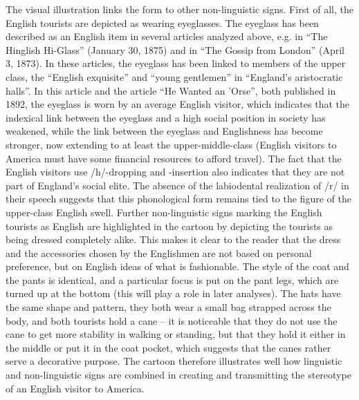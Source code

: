 The visual illustration links the form to other non-linguistic signs. First of all, the English tourists are depicted as wearing eyeglasses. The eyeglass has been described as an English item in several articles analyzed above, e.g. in “The Hinglish Hi-Glass” (January 30, 1875) and in “The Gossip from London” (April 3, 1873). In these articles, the eyeglass has been linked to members of the upper class, the “English exquisite” and “young gentlemen” in “England’s aristocratic halls”. In this article and the article “He Wanted an ’Orse”, both published in 1892, the eyeglass is worn by an average English visitor, which indicates that the indexical link between the eyeglass and a high social position in society has weakened, while the link between the eyeglass and Englishness has become stronger, now extending to at least the upper-middle-class (English visitors to America must have some financial resources to afford travel). The fact that the English visitors use /h/-dropping and -insertion also indicates that they are not part of England’s social elite. The absence of the labiodental realization of /r/ in their speech suggests that this phonological form remains tied to the figure of the upper-class English swell. Further non-linguistic signs marking the English tourists as English are highlighted in the cartoon by depicting the tourists as being dressed completely alike. This makes it clear to the reader that the dress and the accessories chosen by the Englishmen are not based on personal preference, but on English ideas of what is fashionable. The style of the coat and the pants is identical, and a particular focus is put on the pant legs, which are turned up at the bottom (this will play a role in later analyses). The hats have the same shape and pattern, they both wear a small bag strapped across the body, and both tourists hold a cane – it is noticeable that they do not use the cane to get more stability in walking or standing, but that they hold it either in the middle or put it in the coat pocket, which suggests that the canes rather serve a decorative purpose. The cartoon therefore illustrates well how linguistic and non-linguistic signs are combined in creating and transmitting the stereotype of an English visitor to America.

